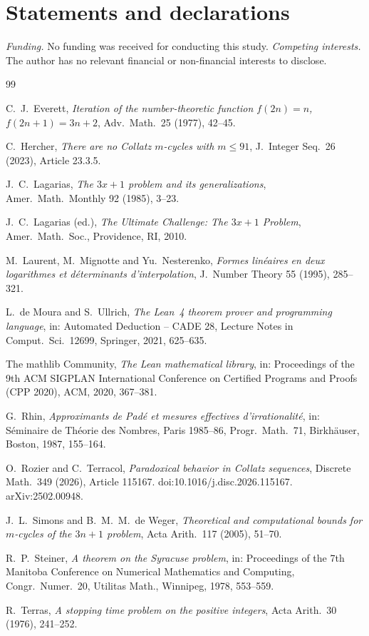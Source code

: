 \documentclass[11pt]{amsart}
\theoremstyle{definition}
\theoremstyle{remark}
\begin{document}
\section*{Statements and declarations}
\emph{Funding.} No funding was received for conducting this study. \emph{Competing interests.} The author has no relevant financial or non-financial interests to disclose.

\begin{thebibliography}{99}

 C.~J.~Everett, \emph{Iteration of the number-theoretic function $f(2n)=n$, $f(2n+1)=3n+2$}, Adv.\ Math.\ 25 (1977), 42--45.

 C.~Hercher, \emph{There are no Collatz $m$-cycles with $m\le91$}, J.~Integer Seq.\ 26 (2023), Article 23.3.5.

 J.~C.~Lagarias, \emph{The $3x+1$ problem and its generalizations}, Amer.\ Math.\ Monthly 92 (1985), 3--23.

 J.~C.~Lagarias (ed.), \emph{The Ultimate Challenge: The $3x+1$ Problem}, Amer.\ Math.\ Soc., Providence, RI, 2010.

 M.~Laurent, M.~Mignotte and Yu.~Nesterenko, \emph{Formes linéaires en deux logarithmes et déterminants d'interpolation}, J.~Number Theory 55 (1995), 285--321.

 L.~de Moura and S.~Ullrich, \emph{The Lean~4 theorem prover and programming language}, in: Automated Deduction -- CADE 28, Lecture Notes in Comput.\ Sci.\ 12699, Springer, 2021, 625--635.

 The mathlib Community, \emph{The Lean mathematical library}, in: Proceedings of the 9th ACM SIGPLAN International Conference on Certified Programs and Proofs (CPP 2020), ACM, 2020, 367--381.

 G.~Rhin, \emph{Approximants de Padé et mesures effectives d'irrationalité}, in: Séminaire de Théorie des Nombres, Paris 1985--86, Progr.\ Math.\ 71, Birkhäuser, Boston, 1987, 155--164.

 O.~Rozier and C.~Terracol, \emph{Paradoxical behavior in Collatz sequences}, Discrete Math.\ 349 (2026), Article 115167. doi:10.1016/j.disc.2026.115167. arXiv:2502.00948.

 J.~L.~Simons and B.~M.~M.~de Weger, \emph{Theoretical and computational bounds for $m$-cycles of the $3n+1$ problem}, Acta Arith.\ 117 (2005), 51--70.

 R.~P.~Steiner, \emph{A theorem on the Syracuse problem}, in: Proceedings of the 7th Manitoba Conference on Numerical Mathematics and Computing, Congr.\ Numer.\ 20, Utilitas Math., Winnipeg, 1978, 553--559.

 R.~Terras, \emph{A stopping time problem on the positive integers}, Acta Arith.\ 30 (1976), 241--252.

\end{thebibliography}
\end{document}
